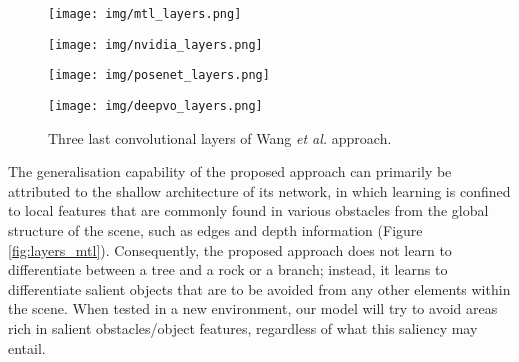 \documentclass[letterpaper, 10 pt, journal, twoside]{IEEEtran}
\newcommand{\etal}{\emph{et al.}}
\begin{document}
 

\begin{figure}
    \centering
    \texttt{[image: img/mtl\_layers.png]}
    \vspace{-0.9cm}
    \caption{Heat and activation maps from the three last convolutional layers of the proposed approach, prior to flattening. Row (A) shows the results of testing the forest environment, while row (B) the plain field and (C) the snowy environment.}
    
    \label{fig:layers_mtl}
\vspace{0.2cm}
\texttt{[image: img/nvidia\_layers.png]}
    \vspace{-0.8cm}
    \caption{Three last convolutional layers of Bojarski \etal \cite{bojarski2016end} approach.}
    \label{fig:layers_nvidia}
\vspace{0.2cm}
\texttt{[image: img/posenet\_layers.png]}
    \vspace{-0.8cm}
    \caption{Three last inception layers of Kendall \etal \cite{kendall2015posenet} approach.}
    \label{fig:layers_posenet}
\vspace{0.2cm}

\texttt{[image: img/deepvo\_layers.png]}
    \vspace{-0.7cm}
    \caption{Three last convolutional layers of Wang \etal \cite{wang2017deepvo} approach.}
    \label{fig:layers_deepvo}
    \vspace{-0.5cm}
\end{figure}


The generalisation capability of the proposed approach can primarily be attributed to the shallow architecture of its network, in which learning is confined to local features that are commonly found in various obstacles from the global structure of the scene, such as edges and depth information (Figure \ref{fig:layers_mtl}). Consequently, the proposed approach does not learn to differentiate between a tree and a rock or a branch; instead, it learns to differentiate salient objects that are to be avoided from any other elements within the scene. When tested in a new environment, our model will try to avoid areas rich in salient obstacles/object features, regardless of what this saliency may entail.
\end{document}
